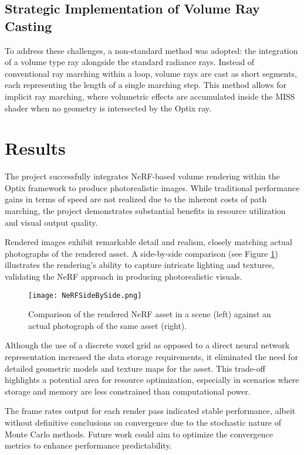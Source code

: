 \documentclass[conference]{IEEEtran}
\begin{document}
\subsection{Strategic Implementation of Volume Ray Casting}
To address these challenges, a non-standard method was adopted: the integration of a volume type ray alongside the standard radiance rays. Instead of conventional ray marching within a loop, volume rays are cast as short segments, each representing the length of a single marching step. This method allows for implicit ray marching, where volumetric effects are accumulated inside the MISS shader when no geometry is intersected by the Optix ray.


\section{Results}

The project successfully integrates NeRF-based volume rendering within the Optix framework to produce photorealistic images. While traditional performance gains in terms of speed are not realized due to the inherent costs of path marching, the project demonstrates substantial benefits in resource utilization and visual output quality.


Rendered images exhibit remarkable detail and realism, closely matching actual photographs of the rendered asset. A side-by-side comparison (see Figure \ref{fig:render_vs_photo}) illustrates the rendering's ability to capture intricate lighting and textures, validating the NeRF approach in producing photorealistic visuals.

\begin{figure}[ht]
    \centering
    \texttt{[image: NeRFSideBySide.png]}
    \caption{Comparison of the rendered NeRF asset in a scene (left) against an actual photograph of the same asset (right).}
    \label{fig:render_vs_photo}
\end{figure}


Although the use of a discrete voxel grid as opposed to a direct neural network representation increased the data storage requirements, it eliminated the need for detailed geometric models and texture maps for the asset. This trade-off highlights a potential area for resource optimization, especially in scenarios where storage and memory are less constrained than computational power.


The frame rates output for each render pass indicated stable performance, albeit without definitive conclusions on convergence due to the stochastic nature of Monte Carlo methods. Future work could aim to optimize the convergence metrics to enhance performance predictability.
\end{document}
